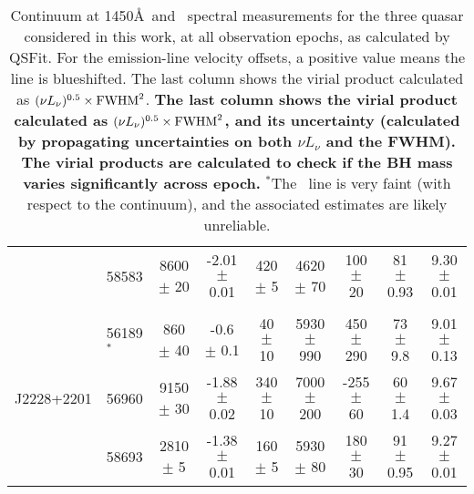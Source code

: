 \begin{table*}
\begin{centering}
\begin{tabular}{l  l | c c | c c c c | c}
                       &  58583        &    8600    $\pm$   20      &  -2.01 $\pm$ 0.01                             & 420    $\pm$  5        &  4620 $\pm$   70        &     100    $\pm$   20      &   81 $\pm$  0.93  &  9.30 $\pm$ 0.01\\
                       &                    &                                         &                                                          &                                   &                                   &                                        &                                    &                  \\
                       &  56189$^*$ &     860    $\pm$   40     &  -0.6  $\pm$ 0.1                                  &  40    $\pm$  10       &  5930 $\pm$  990      &     450    $\pm$  290      &   73  $\pm$  9.8   &  9.01  $\pm$ 0.13 \\
 J2228+2201  &  56960        &    9150    $\pm$   30     &  -1.88 $\pm$ 0.02                               &  340    $\pm$  10     &  7000 $\pm$  200     &    -255    $\pm$   60      &   60  $\pm$  1.4   &  9.67 $\pm$ 0.03\\
                      &  58693        &    2810  $\pm$    5        &  -1.38 $\pm$ 0.01                               &  160    $\pm$   5      &  5930 $\pm$   80       &     180    $\pm$   30      &   91 $\pm$  0.95  &  9.27 $\pm$ 0.01\\
      \hline
      \hline
      \hline
    \end{tabular}
    \caption{
      Continuum at 1450\AA\ and \civ\ spectral measurements for the
      three quasar considered in this work, at all observation epochs, as
      calculated by QSFit.  For the emission-line velocity offsets, a
      positive value means the line is blueshifted.  The last column shows
      the virial product calculated as $(\nu L_{\nu})^{0.5} \times {\rm
        FWHM}^2$.  {\bf The last column shows the virial product calculated as
        $(\nu L_{\nu})^{0.5} \times {\rm FWHM}^2$, and its uncertainty
        (calculated by propagating uncertainties on both $\nu L_{\nu}$ and the
        FWHM).  The virial products are calculated to check if the BH mass
        varies significantly across epoch.  } $^{*}$The \civ\ line is very
      faint (with respect to the continuum), and the associated estimates
      are likely unreliable.
    }
    \label{tab:QSFit-results}
  \end{centering}
\end{table*}